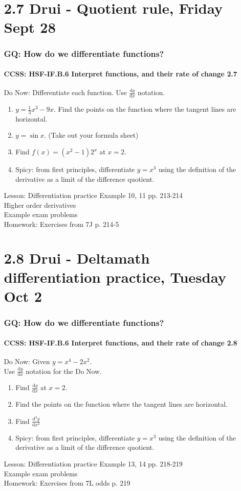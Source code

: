\documentclass{beamer}
\begin{document}
\section{2.7 Drui - Quotient rule, Friday Sept 28}
  \frame
  {
    \frametitle{GQ: How do we differentiate functions?}
    \framesubtitle{CCSS: HSF-IF.B.6 Interpret functions, and their rate of change  \alert{2.7}}

    \begin{block}{Do Now: Differentiate each function. Use $\frac{\mathrm{d}y}{\mathrm{d}x}$ notation.}
      \begin{enumerate}
      \item $y= \frac{1}{3}x^3-9x$. Find the points on the function where the tangent lines are horizontal.
      \item $y=\sin x$. (Take out your formula sheet)
      \item Find $f(x)=(x^2-1) 2^x$ at $x=2$.
      \item Spicy: from first principles, differentiate $y=x^3$ using the definition of the derivative as a limit of the difference quotient.
      \end{enumerate}
   \end{block}
    Lesson: Differentiation practice Example 10, 11 pp. 213-214\\
    Higher order derivatives \\
    Example exam problems\\ \bigskip
    Homework: Exercises from 7J p. 214-5
  }

\section{2.8 Drui - Deltamath differentiation practice, Tuesday Oct 2}
  \frame
  {
    \frametitle{GQ: How do we differentiate functions?}
    \framesubtitle{CCSS: HSF-IF.B.6 Interpret functions, and their rate of change  \alert{2.8}}

    \begin{block}{Do Now: Given $y= x^4-2x^2$. \\Use $\frac{\mathrm{d}y}{\mathrm{d}x}$ notation for the Do Now.}
      \begin{enumerate}
      \item Find $\frac{\mathrm{d}y}{\mathrm{d}x}$ at $x=2$.
      \item Find the points on the function where the tangent lines are horizontal.
      \item Find $\frac{\mathrm{d}^2y}{\mathrm{d}x^2}$
      \item Spicy: from first principles, differentiate $y=x^3$ using the definition of the derivative as a limit of the difference quotient.
      \end{enumerate}
   \end{block}
    Lesson: Differentiation practice Example 13, 14 pp. 218-219\\
    Example exam problems\\ \bigskip
    Homework: Exercises from 7L odds p. 219
  }
\end{document}

